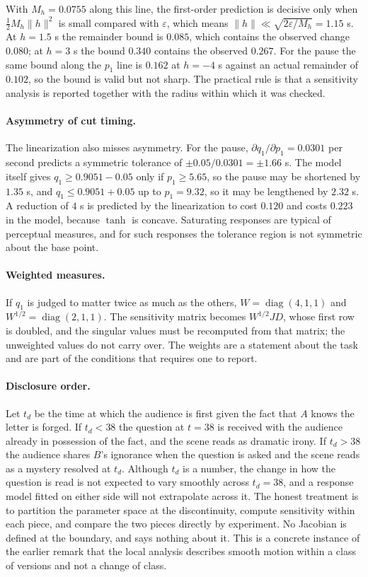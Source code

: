 With $M_h=0.0755$ along this line, the first-order prediction is decisive only when $\tfrac12M_h\lVert h\rVert^2$ is small compared with $\varepsilon$, which means $\lVert h\rVert\ll\sqrt{2\varepsilon/M_h}=1.15$ s. At $h=1.5$ s the remainder bound is $0.085$, which contains the observed change $0.080$; at $h=3$ s the bound $0.340$ contains the observed $0.267$. For the pause the same bound along the $p_1$ line is $0.162$ at $h=-4$ s against an actual remainder of $0.102$, so the bound is valid but not sharp. The practical rule is that a sensitivity analysis is reported together with the radius within which it was checked.

\paragraph{Asymmetry of cut timing.} The linearization also misses asymmetry. For the pause, $\partial q_1/\partial p_1=0.0301$ per second predicts a symmetric tolerance of $\pm0.05/0.0301=\pm1.66$ s. The model itself gives $q_1\ge0.9051-0.05$ only if $p_1\ge5.65$, so the pause may be shortened by $1.35$ s, and $q_1\le0.9051+0.05$ up to $p_1=9.32$, so it may be lengthened by $2.32$ s. A reduction of $4$ s is predicted by the linearization to cost $0.120$ and costs $0.223$ in the model, because $\tanh$ is concave. Saturating responses are typical of perceptual measures, and for such responses the tolerance region is not symmetric about the base point.

\paragraph{Weighted measures.} If $q_1$ is judged to matter twice as much as the others, $W=\operatorname{diag}(4,1,1)$ and $W^{1/2}=\operatorname{diag}(2,1,1)$. The sensitivity matrix becomes $W^{1/2}JD$, whose first row is doubled, and the singular values must be recomputed from that matrix; the unweighted values do not carry over. The weights are a statement about the task and are part of the conditions that  requires one to report.

\paragraph{Disclosure order.} Let $t_d$ be the time at which the audience is first given the fact that $A$ knows the letter is forged. If $t_d<38$ the question at $t=38$ is received with the audience already in possession of the fact, and the scene reads as dramatic irony. If $t_d>38$ the audience shares $B$'s ignorance when the question is asked and the scene reads as a mystery resolved at $t_d$. Although $t_d$ is a number, the change in how the question is read is not expected to vary smoothly across $t_d=38$, and a response model fitted on either side will not extrapolate across it. The honest treatment is to partition the parameter space at the discontinuity, compute sensitivity within each piece, and compare the two pieces directly by experiment. No Jacobian is defined at the boundary, and  says nothing about it. This is a concrete instance of the earlier remark that the local analysis describes smooth motion within a class of versions and not a change of class.

